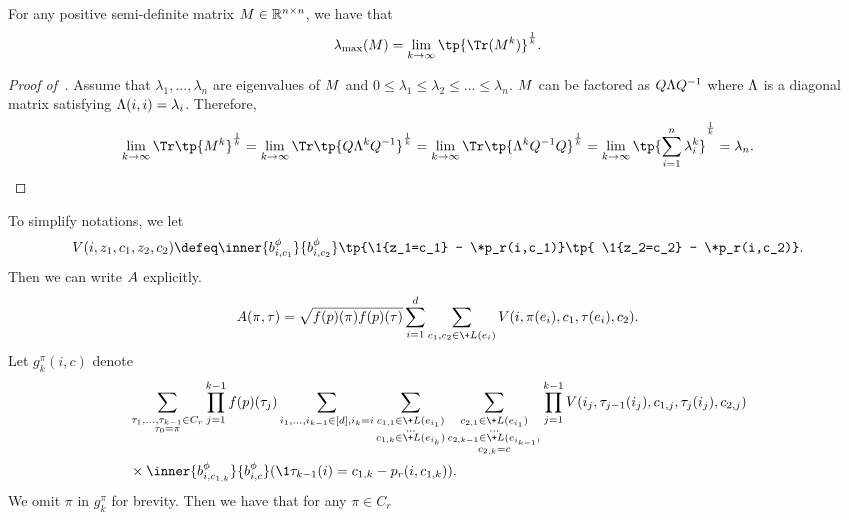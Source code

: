 \documentclass[a4paper,11pt]{article}
\begin{document}
\begin{lemma}\label{lem:clac_lammax}
    For any positive semi-definite matrix $\*M \in \mathbb R^{n\times n}$, we have that
    \[
        \lambda_{\max} (\*M) = \lim_{k\to \infty}
        \tp{\Tr(\*M^k)}^{\frac 1k}.
    \]
\end{lemma}
\begin{proof}[Proof of~]
    Assume that $\lambda_1,...,\lambda_n$ are eigenvalues of $\*M$ and $0\leq \lambda_1 \leq \lambda_2 \leq ... \leq \lambda_n$.
    $\*M$ can be factored as $\*Q\*\Lambda\*Q^{-1}$ where $\*\Lambda$ is a diagonal matrix satisfying $\*\Lambda(i,i) = \lambda_i$.
    Therefore,
    \begin{equation*}
        \lim_{k\to \infty}\Tr\tp{\*M^k}^{\frac 1k}
        = \lim_{k\to \infty}\Tr\tp{\*Q\*\Lambda^k\*Q^{-1}}^{\frac 1k}
        = \lim_{k\to \infty}\Tr\tp{\*\Lambda^k\*Q^{-1}\*Q}^{\frac 1k}
        = \lim_{k\to \infty} \tp{\sum_{i=1}^n \lambda_i^k}^{\frac 1k}
        =\lambda_n.
        \qedhere
    \end{equation*}
\end{proof}
To simplify notations, we let
\[
V(i,z_1,c_1,z_2,c_2) \defeq \inner{\*b_{i,c_1}^\phi}{\*b_{i,c_2}^\phi}
    \tp{\1{z_1=c_1} - \*p_r(i,c_1)}\tp{
    \1{z_2=c_2} - \*p_r(i,c_2)}.
\]
Then we can write $\*A$ explicitly.
\begin{equation}\label{eq:equation_A}
    \*A(\pi,\tau) = \sqrt{f(\*p)(\pi)f(\*p)(\tau)} \sum_{i=1}^d \sum_{c_1,c_2\in \+L(e_i)} V(i,\pi(e_i),c_1,\tau(e_i),c_2).
\end{equation}
Let $g_k^\pi(i,c)$ denote
\begin{align*}
    &\sum_{\substack{\tau_1,...,\tau_{k-1}\in C_r\\ \tau_0=\pi}} \prod_{j=1}^{k-1}f(\*p)(\tau_j)
    \sum_{i_1,...,i_{k-1}\in[d],i_k=i}
    \sum_{\substack{c_{1,1}\in \+L(e_{i_1})\\...\\c_{1,k}\in \+L(e_{i_k})}}
    \sum_{\substack{c_{2,1}\in \+L(e_{i_1})\\...\\c_{2,k-1}\in \+L(e_{i_{k-1})}\\c_{2,k}=c}}
    \prod_{j=1}^{k-1} V(i_j,\tau_{j-1}(i_j),c_{1,j},\tau_j(i_j),c_{2,j})
    \\&\times \inner{\*b_{i,c_{1,k}}^\phi}{\*b_{i,c}^\phi}(\1{\tau_{k-1}(i) = c_{1,k}} -  \*p_r(i,c_{1,k})).
\end{align*}
We omit $\pi$ in $g_k^\pi$ for brevity.
Then we have that for any $\pi \in C_r$
\end{document}
